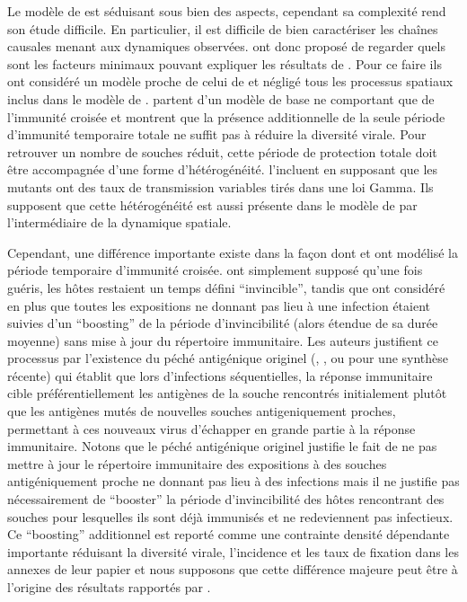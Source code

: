 Le modèle de \citet{Ferguson2003} est séduisant sous bien des aspects,
cependant sa complexité rend son étude difficile. En particulier, il
est difficile de bien caractériser les chaînes causales menant aux
dynamiques observées. \citet{Tria2005} ont donc proposé de regarder
quels sont les facteurs minimaux pouvant expliquer les résultats de
\citet{Ferguson2003}. Pour ce faire ils ont considéré un modèle proche
de celui de \citet{Girvan2002} et négligé tous les processus spatiaux
inclus dans le modèle de \citet{Ferguson2003}. \citet{Tria2005}
partent d'un modèle de base ne comportant que de l'immunité croisée et
montrent que la présence additionnelle de la seule période d'immunité
temporaire totale ne suffit pas à réduire la diversité virale. Pour
retrouver un nombre de souches réduit, cette période de protection
totale doit être accompagnée d'une forme d'hétérogénéité.
\citet{Tria2005} l'incluent en supposant que les mutants ont des taux
de transmission variables tirés dans une loi Gamma. Ils supposent que
cette hétérogénéité est aussi présente dans le modèle de
\citet{Ferguson2003} par l'intermédiaire de la dynamique spatiale.

Cependant, une différence importante existe dans la façon dont
\citet{Ferguson2003} et \citet{Tria2005} ont modélisé la période
temporaire d'immunité croisée. \citet{Tria2005} ont simplement supposé
qu'une fois guéris, les hôtes restaient un temps défini
``invincible'', tandis que \citet{Ferguson2003} ont considéré en plus
que toutes les expositions ne donnant pas lieu à une infection étaient
suivies d'un ``boosting'' de la période d'invincibilité (alors étendue
de sa durée moyenne) sans mise à jour du répertoire immunitaire. Les
auteurs justifient ce processus par l'existence du péché antigénique
originel (\citet{Francis1953}, \citet{St1966}, \citet{St1966a} ou
\citet{Kim2009} pour une synthèse récente) qui établit que lors
d'infections séquentielles, la réponse immunitaire cible
préférentiellement les antigènes de la souche rencontrés initialement
plutôt que les antigènes mutés de nouvelles souches antigeniquement
proches, permettant à ces nouveaux virus d'échapper en grande partie à
la réponse immunitaire.  Notons que le péché antigénique originel
justifie le fait de ne pas mettre à jour le répertoire immunitaire des
expositions à des souches antigéniquement proche ne donnant pas lieu à
des infections mais il ne justifie pas nécessairement de ``booster''
la période d'invincibilité des hôtes rencontrant des souches pour
lesquelles ils sont déjà immunisés et ne redeviennent pas infectieux.
Ce ``boosting'' additionnel est reporté comme une contrainte densité
dépendante importante réduisant la diversité virale, l'incidence et
les taux de fixation dans les annexes de leur papier et nous supposons
que cette différence majeure peut être à l'origine des résultats
rapportés par \citet{Tria2005}.

